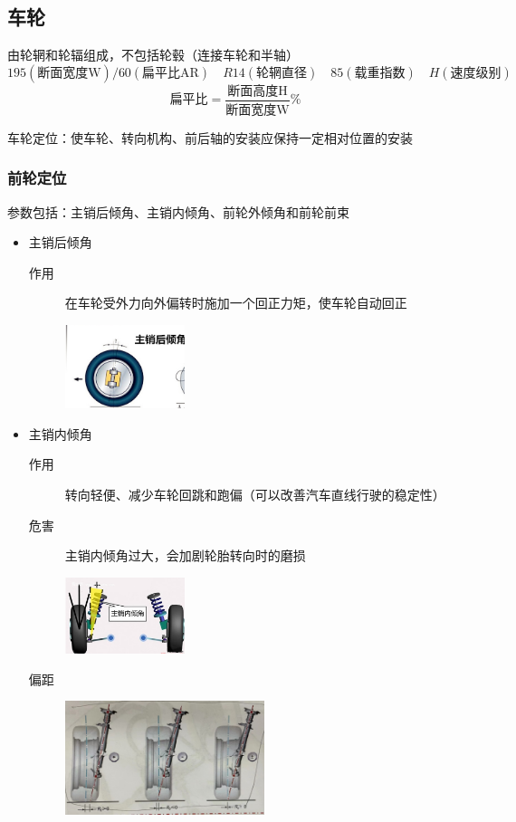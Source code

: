 		\subsection{车轮}
			由轮辋和轮辐组成，不包括轮毂（连接车轮和半轴）
				\[ 195(\text{断面宽度W})/60(\text{扁平比AR})\quad R14(\text{轮辋直径})\quad 85(载重指数)\quad H(\text{}速度级别) \]
				\[  \text{扁平比} = \dfrac{\text{断面高度H}}{\text{断面宽度W}}\%\]
					
			车轮定位：使车轮、转向机构、前后轴的安装应保持一定相对位置的安装
			\subsubsection{前轮定位}
				参数包括：主销后倾角、主销内倾角、前轮外倾角和前轮前束
				\begin{itemize}
					\item 主销后倾角
						\begin{description}
							\item[作用]在车轮受外力向外偏转时施加一个回正力矩，使车轮自动回正
								\begin{center}
									\includegraphics[width=0.3\textwidth]{3-28}
								\end{center}
						\end{description}
					\item 主销内倾角
						\begin{description}
							\item[作用] 转向轻便、减少车轮回跳和跑偏（可以改善汽车直线行驶的稳定性）
							\item[危害] 主销内倾角过大，会加剧轮胎转向时的磨损
								\begin{center}
									\includegraphics[width=0.3\textwidth]{3-29}
								\end{center}
							\item[偏距]							
								\begin{center}
									\includegraphics[width=0.5\textwidth]{3-30}

\end{center}
\end{description}
\end{itemize}
